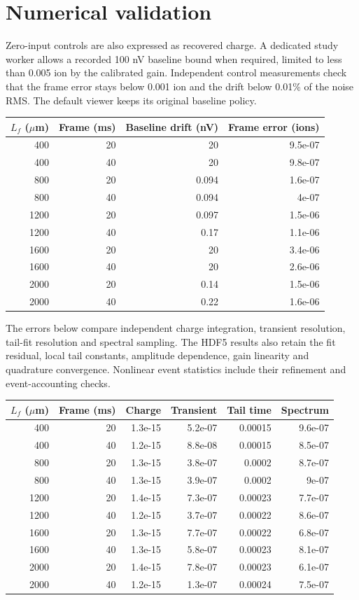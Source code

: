 \documentclass[10pt,a4paper]{article}
\begin{document}
\section{Numerical validation}
Zero-input controls are also expressed as recovered charge. A dedicated study
worker allows a recorded 100 nV baseline bound when required, limited to less
than 0.005 ion by the calibrated gain. Independent control measurements check
that the frame error stays below 0.001 ion and the drift below 0.01\% of the
noise RMS. The default viewer keeps its original baseline policy.

\begin{center}\small\begin{longtable}{rrrr}\toprule
$L_f$ ($\mu$m) & Frame (ms) & Baseline drift (nV) & Frame error (ions)\\\midrule
400 & 20 & 20 & 9.5e-07 \\
400 & 40 & 20 & 9.8e-07 \\
800 & 20 & 0.094 & 1.6e-07 \\
800 & 40 & 0.094 & 4e-07 \\
1200 & 20 & 0.097 & 1.5e-06 \\
1200 & 40 & 0.17 & 1.1e-06 \\
1600 & 20 & 20 & 3.4e-06 \\
1600 & 40 & 20 & 2.6e-06 \\
2000 & 20 & 0.14 & 1.5e-06 \\
2000 & 40 & 0.22 & 1.6e-06 \\
\bottomrule\end{longtable}\end{center}

The errors below compare independent charge integration, transient resolution,
tail-fit resolution and spectral sampling. The HDF5 results also retain the
fit residual, local tail constants, amplitude dependence, gain linearity and
quadrature convergence. Nonlinear event statistics include their refinement
and event-accounting checks.
\begin{center}\scriptsize\begin{longtable}{rrrrrr}\toprule
$L_f$ ($\mu$m) & Frame (ms) & Charge & Transient & Tail time & Spectrum\\\midrule
400 & 20 & 1.3e-15 & 5.2e-07 & 0.00015 & 9.6e-07 \\
400 & 40 & 1.2e-15 & 8.8e-08 & 0.00015 & 8.5e-07 \\
800 & 20 & 1.3e-15 & 3.8e-07 & 0.0002 & 8.7e-07 \\
800 & 40 & 1.3e-15 & 3.9e-07 & 0.0002 & 9e-07 \\
1200 & 20 & 1.4e-15 & 7.3e-07 & 0.00023 & 7.7e-07 \\
1200 & 40 & 1.2e-15 & 3.7e-07 & 0.00022 & 8.6e-07 \\
1600 & 20 & 1.3e-15 & 7.7e-07 & 0.00022 & 6.8e-07 \\
1600 & 40 & 1.3e-15 & 5.8e-07 & 0.00023 & 8.1e-07 \\
2000 & 20 & 1.4e-15 & 7.8e-07 & 0.00023 & 6.1e-07 \\
2000 & 40 & 1.2e-15 & 1.3e-07 & 0.00024 & 7.5e-07 \\
\bottomrule\end{longtable}\end{center}
\end{document}
